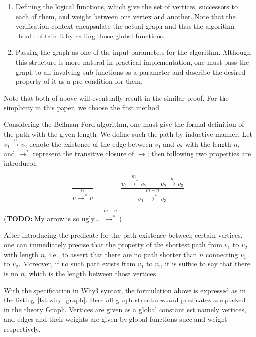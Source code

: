 \documentclass[a4paper,12pt]{article}
\begin{document}
\begin{enumerate}

\item Defining the logical functions, which give the set of vertices, successors to each of them, and weight between one vertex and another. Note that the verification context encapsulate the actual graph and thus the algorithm should obtain it by calling those global functions.

\item Passing the graph as one of the input parameters for the algorithm. Although this structure is more natural in practical implementation, one must pass the graph to all involving sub-functions as a parameter and describe the desired property of it as a pre-condition for them.

\end{enumerate}

Note that both of above will eventually result in the similar proof. For the simplicity in this paper, we choose the first method.

Considering the Bellman-Ford algorithm, one must give the formal definition of the path with the given length. We define such the path by inductive manner. Let $ v_1 \stackrel{n}{\to} v_2 $ denote the existence of the edge between $ v_1 $ and $ v_2 $ with the length $ n $, and $ \to ^* $ represent the transitive closure of $ \to $; then following two properties are introduced.

\begin{displaymath}
  \frac{}
       {v{\stackrel{0}{\to^*}} v}
  \qquad\qquad
  \frac{v_1\stackrel{m}{\to^*}v_2 \qquad v_2\stackrel{n}{\to}v_3}
       {v_1\stackrel{m+n}{\longrightarrow^*}v_3}
\end{displaymath}

(\textbf{TODO:} My arrow is so ugly... $ \stackrel{m+n}{\longrightarrow^*} $)

After introducing the predicate for the path existence between certain vertices, one can immediately precise that the property of the shortest path from $ v_1 $ to $ v_2 $ with length $ n $, i.e., to assert that there are no path shorter than $ n $ connecting $ v_1 $ to $ v_2 $. Moreover, if no such path exists from $ v_1 $ to $ v_2 $, it is suffice to say that there is no $ n $, which is the length between those vertices.

With the specification in Why3 syntax, the formulation above is expressed as in the listing~\ref{lst:why_graph}. Here all graph structures and predicates are packed in the theory \mbox{\sc Graph}. Vertices are given as a global constant set namely \mbox{\sc vertices}, and edges and their weights are given by global functions \mbox{\sc succ} and \mbox{\sc weight} respectively.
\end{document}
